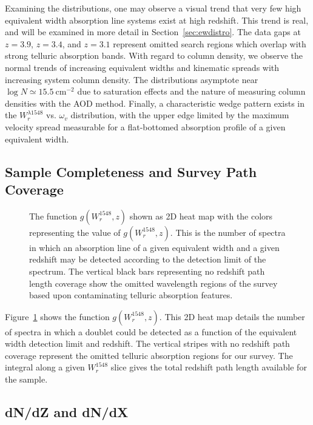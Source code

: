 \documentclass[linenumbers,twocolumn]{aastex61}
\begin{document}
Examining the distributions, one may observe a visual trend that very few high equivalent width {\CIV} absorption line systems exist at high redshift. This trend is real, and will be examined in more detail in Section~\ref{sec:ewdistro}. The data gaps at $z = 3.9$, $z = 3.4$, and $z = 3.1$ represent omitted search regions which overlap with strong telluric absorption bands. With regard to column density, we observe the normal trends of increasing equivalent widths and kinematic spreads with increasing system column density. The distributions asymptote near $\log N \simeq 15.5~\mathrm{cm^{-2}}$ due to saturation effects and the nature of measuring column densities with the AOD method. Finally, a characteristic wedge pattern exists in the $W_r^{\lambda 1548}$ vs. $\omega_v$ distribution, with the upper edge limited by the maximum velocity spread measurable for a flat-bottomed absorption profile of a given equivalent width.

\subsection{Sample Completeness and Survey Path Coverage}

\begin{figure}[bth]
\caption{The function $g(W_r^{1548}, z)$ shown as 2D heat map with the colors representing the value of $g(W_r^{1548}, z)$. This is the number of spectra in which an absorption line of a given equivalent width and a given redshift may be detected according to the detection limit of the spectrum. The vertical black bars representing no redshift path length coverage show the omitted wavelength regions of the survey based upon contaminating telluric absorption features.}
\label{fig:gwz}
\end{figure}

Figure~\ref{fig:gwz} shows the function $g(W_r^{1548}, z)$. This 2D heat map details the number of spectra in which a {\CIVdblt} doublet could be detected as a function of the equivalent width detection limit and redshift. The vertical stripes with no redshift path coverage represent the omitted telluric absorption regions for our survey. The integral along a given $W_r^{1548}$ slice gives the total redshift path length available for the sample.

\subsection{dN/dZ and dN/dX}
\label{dndzdndx}
\end{document}
